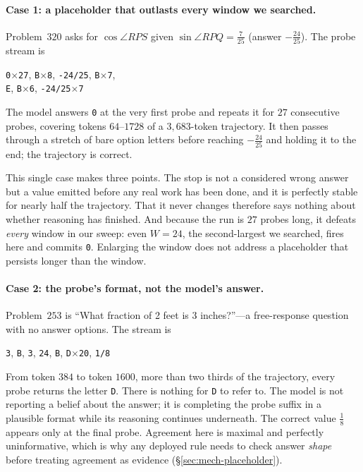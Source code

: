 \paragraph{Case 1: a placeholder that outlasts every window we searched.}
Problem~$320$ asks for $\cos\angle RPS$ given $\sin\angle RPQ=\tfrac{7}{25}$
(answer $-\tfrac{24}{25}$). The probe stream is
\begin{center}\small
\texttt{0}$\times$\texttt{27},\; \texttt{B}$\times$\texttt{8},\;
\texttt{-24/25},\; \texttt{B}$\times$\texttt{7},\\
\texttt{E},\; \texttt{B}$\times$\texttt{6},\;
\texttt{-24/25}$\times$\texttt{7}
\end{center}
The model answers \texttt{0} at the very first probe and repeats it for $27$
consecutive probes, covering tokens $64$--$1728$ of a $3{,}683$-token
trajectory. It then passes through a stretch of bare option letters before
reaching $-\tfrac{24}{25}$ and holding it to the end; the trajectory is correct.

This single case makes three points. The stop is not a considered wrong answer
but a value emitted before any real work has been done, and it is perfectly
stable for nearly half the trajectory. That it never changes therefore says nothing about
whether reasoning has finished. And because the run is $27$ probes long, it
defeats \emph{every} window in our sweep: even $W{=}24$, the second-largest we
searched, fires here and commits \texttt{0}. Enlarging the window does not
address a placeholder that persists longer than the window.

\paragraph{Case 2: the probe's format, not the model's answer.}
Problem~$253$ is ``What fraction of 2 feet is 3 inches?''---a free-response
question with no answer options. The stream is
\begin{center}\small
\texttt{3},\; \texttt{B},\; \texttt{3},\; \texttt{24},\; \texttt{B},\;
\texttt{D}$\times$\texttt{20},\; \texttt{1/8}
\end{center}
From token $384$ to token $1600$, more than two thirds of the trajectory, every
probe returns the letter \texttt{D}. There is nothing for \texttt{D} to refer to.
The model is not reporting a belief about the answer; it is completing the probe
suffix in a plausible format while its reasoning continues underneath. The
correct value $\tfrac{1}{8}$ appears only at the final probe. Agreement here is
maximal and perfectly uninformative, which is why any deployed rule needs to
check answer \emph{shape} before treating agreement as evidence
(\S\ref{sec:mech-placeholder}).

